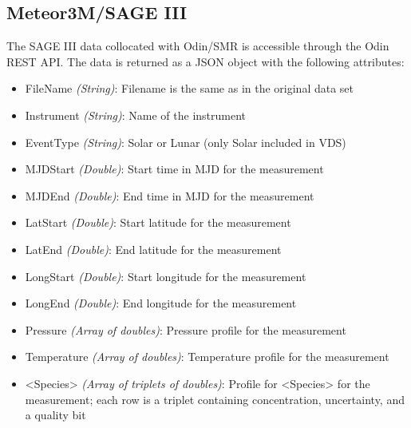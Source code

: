 \subsection{Meteor3M/SAGE III}
The SAGE III data collocated with Odin/SMR is accessible through the Odin REST
API. The data is returned as a JSON object with the following attributes:
\begin{itemize}
    \item FileName    \emph{(String)}: Filename is the same as in the original
        data set \\
    \item Instrument  \emph{(String)}: Name of the instrument \\
    \item EventType   \emph{(String)}: Solar or Lunar (only Solar included in
        VDS) \\
    \item MJDStart    \emph{(Double)}: Start time in MJD for the measurement \\
    \item MJDEnd      \emph{(Double)}: End time in MJD for the measurement \\
    \item LatStart    \emph{(Double)}: Start latitude for the measurement \\
    \item LatEnd      \emph{(Double)}: End latitude for the measurement \\
    \item LongStart   \emph{(Double)}: Start longitude for the measurement \\
    \item LongEnd     \emph{(Double)}: End longitude for the measurement \\
    \item Pressure    \emph{(Array of doubles)}: Pressure profile for the
        measurement \\
    \item Temperature \emph{(Array of doubles)}: Temperature profile for the
        measurement \\
    \item <Species>   \emph{(Array of triplets of doubles)}: Profile for
        <Species> for the measurement; each row is a triplet containing
        concentration, uncertainty, and a quality bit
\end{itemize}



